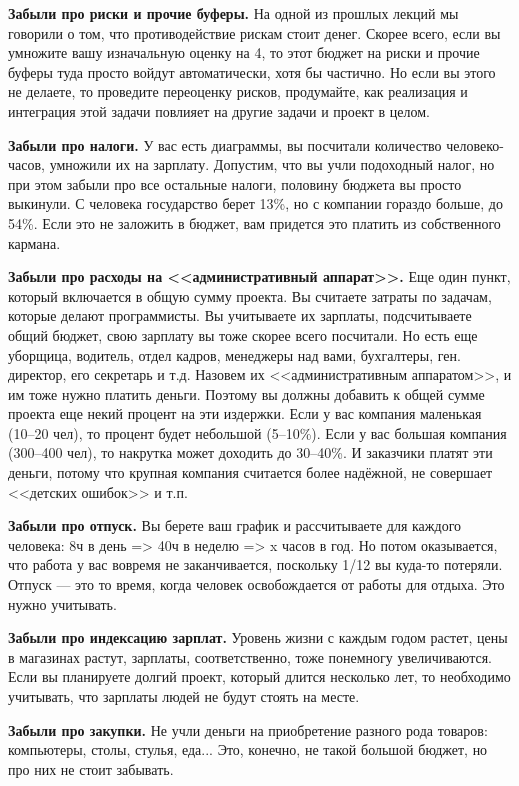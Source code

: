 \documentclass{../../text-style}
\begin{document}
\textbf{Забыли про риски и прочие буферы.} На одной из прошлых лекций мы говорили о том, что противодействие рискам стоит денег. Скорее всего, если вы умножите вашу изначальную оценку на 4, то этот бюджет на риски и прочие буферы туда просто войдут автоматически, хотя бы частично. Но если вы этого не делаете, то проведите переоценку рисков, продумайте, как реализация и интеграция этой задачи повлияет на другие задачи и проект в целом.

\textbf{Забыли про налоги.} У вас есть диаграммы, вы посчитали количество человеко-часов, умножили их на зарплату. Допустим, что вы учли подоходный налог, но при этом забыли про все остальные налоги, половину бюджета вы просто выкинули. С человека государство берет 13\%, но с компании гораздо больше, до 54\%. Если это не заложить в бюджет, вам придется это платить из собственного кармана.

\textbf{Забыли про расходы на <<административный аппарат>>.} Еще один пункт, который включается в общую сумму проекта. Вы считаете затраты по задачам, которые делают программисты. Вы учитываете их зарплаты, подсчитываете общий бюджет, свою зарплату вы тоже скорее всего посчитали. Но есть еще уборщица, водитель, отдел кадров, менеджеры над вами, бухгалтеры, ген. директор, его секретарь и т.д. Назовем их <<административным аппаратом>>, и им тоже нужно платить деньги. Поэтому вы должны добавить к общей сумме проекта еще некий процент на эти издержки. Если у вас компания маленькая (10–20 чел), то процент будет небольшой (5–10\%). Если у вас большая компания (300–400 чел), то накрутка может доходить до 30–40\%. И заказчики платят эти деньги, потому что крупная компания считается более надёжной, не совершает <<детских ошибок>> и т.п.

\textbf{Забыли про отпуск.} Вы берете ваш график и рассчитываете для каждого человека: 8ч в день => 40ч в неделю => x часов в год. Но потом оказывается, что работа у вас вовремя не заканчивается, поскольку 1/12 вы куда-то потеряли. Отпуск --- это то время, когда человек освобождается от работы для отдыха. Это нужно учитывать.

\textbf{Забыли про индексацию зарплат.} Уровень жизни с каждым годом растет, цены в магазинах растут, зарплаты, соответственно, тоже понемногу увеличиваются. Если вы планируете долгий проект, который длится несколько лет, то необходимо учитывать, что зарплаты людей не будут стоять на месте. 

\textbf{Забыли про закупки.} Не учли деньги на приобретение разного рода товаров: компьютеры, столы, стулья, еда... Это, конечно, не такой большой бюджет, но про них не стоит забывать.
\end{document}
